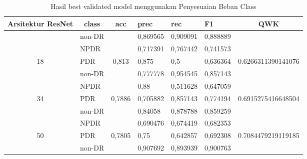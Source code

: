 \begin{table}[H]
	\begin{center}
		\caption{Hasil best validated model menggunakan Penyesuaian Beban Class}
		\label{tb:HasilValClassWeight}
		\begin{tabular}{|c|l|c|l|l|l|c|}
			\hline
			\rowcolor[HTML]{C0C0C0} 
			Arsitektur ResNet     & \multicolumn{1}{c|}{\cellcolor[HTML]{C0C0C0}class} & acc                      & prec     & rec      & F1       & QWK                                  \\ \hline
			& non-DR                                             &                          & 0,869565 & 0,909091 & 0,888889 &                                      \\ \cline{2-2} \cline{4-6}
			& NPDR                                               &                          & 0,717391 & 0,767442 & 0,741573 &                                      \\ \cline{2-2} \cline{4-6}
			\multirow{-3}{*}{18}  & PDR                                                & \multirow{-3}{*}{0,813}  & 0,875    & 0,5      & 0,636364 & \multirow{-3}{*}{0.6266311390141076} \\ \hline
			& non-DR                                             &                          & 0,777778 & 0,954545 & 0,857143 &                                      \\ \cline{2-2} \cline{4-6}
			& NPDR                                               &                          & 0,88     & 0,511628 & 0,647059 &                                      \\ \cline{2-2} \cline{4-6}
			\multirow{-3}{*}{34}  & PDR                                                & \multirow{-3}{*}{0,7886} & 0,705882 & 0,857143 & 0,774194 & \multirow{-3}{*}{0.6915275416648504} \\ \hline
			& non-DR                                             &                          & 0,84058  & 0,878788 & 0,859259 &                                      \\ \cline{2-2} \cline{4-6}
			& NPDR                                               &                          & 0,690476 & 0,674419 & 0,682353 &                                      \\ \cline{2-2} \cline{4-6}
			\multirow{-3}{*}{50}  & PDR                                                & \multirow{-3}{*}{0,7805} & 0,75     & 0,642857 & 0,692308 & \multirow{-3}{*}{0.7084479219119185} \\ \hline
			& non-DR                                             &                          & 0,907692 & 0,893939 & 0,900763 &                                      \\ \cline{2-2} \cline{4-6}

\end{tabular}
\end{center}
\end{table}
